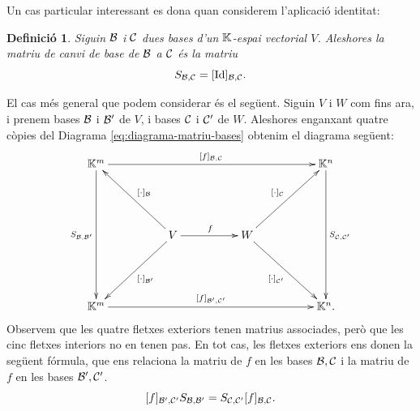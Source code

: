 \documentclass[
  11pt,
]{book}
\numberwithin{dummy}{section}
\theoremstyle{maincolornumbox}
\theoremstyle{blacknumex}
\theoremstyle{blacknumbox}
\newtheorem{definitionT}{Definició}[chapter]
\theoremstyle{maincolornum}
\newenvironment{definition}{\begin{dBox}\begin{definitionT}}{\end{definitionT}\end{dBox}}
\newlength\esp
\begin{document}
Un cas particular interessant es dona quan considerem l'aplicació
identitat:

\begin{definition}
Siguin \(\mathcal{B}\) i \(\mathcal{C}\) dues bases d'un \(\mathbb{K}\)-espai vectorial \(V\).
Aleshores la \emph{matriu de canvi de base} de \(\mathcal{B}\) a \(\mathcal{C}\) és la matriu
\[S_{\mathcal{B},\mathcal{C}} = [\operatorname{Id}]_{\mathcal{B},\mathcal{C}}.\]
\end{definition}

El cas més general que podem considerar és el següent. Siguin \(V\) i \(W\)
com fins ara, i prenem bases \(\mathcal{B}\) i \(\mathcal{B}'\) de \(V\), i bases \(\mathcal{C}\)
i \(\mathcal{C}'\) de \(W\). Aleshores enganxant quatre còpies del
Diagrama \eqref{eq:diagrama-matriu-bases} obtenim el diagrama següent:
\[
\xymatrix@C50pt@R50pt{
\K^m\ar[rrr]^{[f]_{\calb,\calc}}\ar[dd]_{S_{\calb,\calb'}}&&& \K^n\ar[dd]^{S_{\calc,\calc'}}\\
&V\ar[r]^f\ar[ul]_{[\cdot]_\calb}\ar[dl]^{[\cdot]_{\calb'}}&W\ar[ur]^{[\cdot]_{\calc}}\ar[dr]_{[\cdot]_{\calc'}}\\
\K^m\ar[rrr]^{[f]_{\calb',\calc'}}&&&\K^n.
}
\]
Observem que les quatre fletxes exteriors tenen matrius associades,
però que les cinc fletxes interiors no en tenen pas. En tot cas, les
fletxes exteriors ens donen la següent fórmula, que ens relaciona la
matriu de \(f\) en les bases \(\mathcal{B},\mathcal{C}\) i la matriu de \(f\) en les bases
\(\mathcal{B}',\mathcal{C}'\).
\[[f]_{\mathcal{B}',\mathcal{C}'} S_{\mathcal{B},\mathcal{B}'} = S_{\mathcal{C},\mathcal{C}'} [f]_{\mathcal{B},\mathcal{C}}.\]
\end{document}

